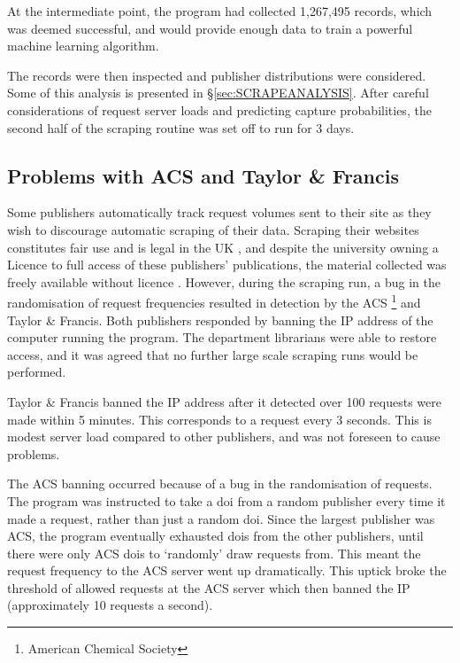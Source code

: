 At the intermediate point, the program had collected 1,267,495 records, which was deemed successful, and would provide enough data to train a powerful machine learning algorithm.

The records were then inspected and publisher distributions were considered. Some of this analysis is presented in \S\ref{sec:SCRAPEANALYSIS}. After careful considerations of request server loads and predicting capture probabilities, the second half of the scraping routine was set off to run for 3 days.
\label{sec:CROSSREFSCRAPE}
\subsection{Problems with ACS and Taylor \& Francis}
Some publishers automatically track request volumes sent to their site as they wish to discourage automatic scraping of their data. Scraping their websites constitutes fair use and is legal in the UK , and despite the university owning a Licence to full access of these publishers' publications, the material collected was freely available without licence\cite{thelaw} \cite{contnentminelegal}. However, during the scraping run, a bug in the randomisation of request frequencies resulted in detection by the ACS \footnote{American Chemical Society} and Taylor \& Francis. Both publishers responded by banning the IP address of the computer running the program. The department librarians were able to restore access, and it was agreed that no further large scale scraping runs would be performed. 

Taylor \& Francis banned the IP address after it detected over 100 requests were made within 5 minutes. This corresponds to a request every 3 seconds. This is modest server load compared to other publishers, and was not foreseen to cause problems.

The ACS banning occurred because of a bug in the randomisation of requests. The program was instructed to take a doi from a random publisher every time it made a request, rather than just a random doi. Since the largest publisher was ACS, the program eventually exhausted dois from the other publishers, until there were only ACS dois to `randomly' draw requests from. This meant the request frequency to the ACS server went up dramatically. This uptick broke the threshold of allowed requests at the ACS server which then banned the IP (approximately 10 requests a second).


